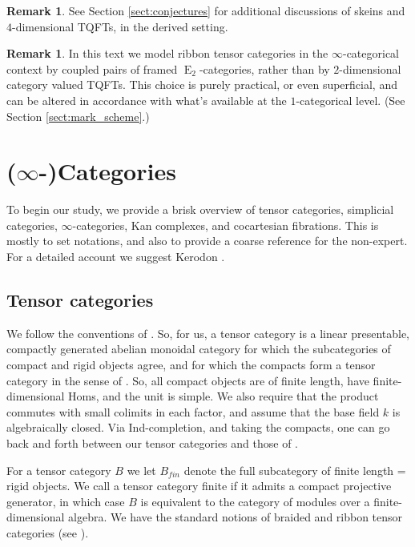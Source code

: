 \documentclass[reqno]{amsart}
\theoremstyle{definition}
\newtheorem{remark}[lemma]{Remark}
\newcommand{\opn}[1]{\operatorname{#1}}
\renewcommand{\1}{\mathbf{1}}
\begin{document}
\begin{remark}
See Section \ref{sect:conjectures} for additional discussions of skeins and $4$-dimensional TQFTs, in the derived setting.
\end{remark}

\begin{remark}
In this text we model ribbon tensor categories in the $\infty$-categorical context by coupled pairs of framed $\opn{E}_2$-categories, rather than by $2$-dimensional category valued TQFTs. This choice is purely practical, or even superficial, and can be altered in accordance with what's available at the $1$-categorical level.  (See Section \ref{sect:mark_scheme}.)
\end{remark}

\section{($\infty$-)Categories}
\label{sect:categories}

To begin our study, we provide a brisk overview of tensor categories, simplicial categories, $\infty$-categories, Kan complexes, and cocartesian fibrations.  This is mostly to set notations, and also to provide a coarse reference for the non-expert.  For a detailed account we suggest Kerodon \cite{kerodon}.

\subsection{Tensor categories}
\label{sect:tensor_cats}

We follow the conventions of \cite{negron26}.  So, for us, a tensor category is a linear presentable, compactly generated abelian monoidal category for which the subcategories of compact and rigid objects agree, and for which the compacts form a tensor category in the sense of \cite{egno15}.  So, all compact objects are of finite length, have finite-dimensional Homs, and the unit is simple.  We also require that the product commutes with small colimits in each factor, and assume that the base field $k$ is algebraically closed.  Via Ind-completion, and taking the compacts, one can go back and forth between our tensor categories and those of \cite{egno15}.
\par

For a tensor category $B$ we let $B_{fin}$ denote the full subcategory of finite length = rigid objects.  We call a tensor category finite if it admits a compact projective generator, in which case $B$ is equivalent to the category of modules over a finite-dimensional algebra.  We have the standard notions of braided and ribbon tensor categories (see \cite{egno15}).
\end{document}
